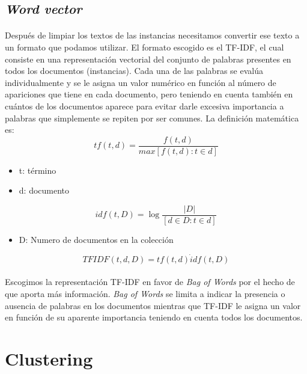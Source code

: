 \documentclass[10pt,a4paper]{article}
\begin{document}
	\subsection{\textit{Word vector}}
	\paragraph{}
	Después de limpiar los textos de las instancias necesitamos convertir ese texto a un formato que podamos utilizar. El formato escogido es el TF-IDF, el cual consiste en una representación vectorial del conjunto de palabras presentes en todos los documentos (instancias). Cada una de las palabras se evalúa individualmente y se le asigna un valor numérico en función al número de apariciones que tiene en cada documento, pero teniendo en cuenta también en cuántos de los documentos aparece para evitar darle excesiva importancia a palabras que simplemente se repiten por ser comunes.
	La definición matemática es: 
		\begin{equation}
	tf(t,d)=\frac{f(t,d)}{max[f(t,d):t \in d]}
	\end{equation}
	\begin{itemize}
	    \item t: término
	    \item d: documento
	\end{itemize}
	\begin{equation}
	idf(t,D)=\log \frac{|D|}{[d \in D : t \in d]}
	\end{equation}
	\begin{itemize}
	    \item D: Numero de documentos en la colección
	\end{itemize}
	\begin{equation}
	TFIDF(t,d,D)=tf(t,d) \dot idf(t,D)
	\end{equation}
	\paragraph{}
	Escogimos la representación TF-IDF en favor de \textit{Bag of Words} por el hecho de que aporta más información. \textit{Bag of Words} se limita a indicar la presencia o ausencia de palabras en los documentos mientras que TF-IDF le asigna un valor en función de su aparente importancia teniendo en cuenta todos los documentos.

\section{Clustering}
\end{document}
